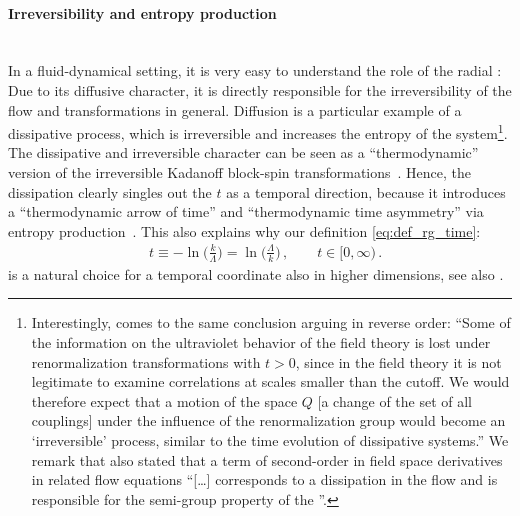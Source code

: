 \paragraph{Irreversibility and entropy production}\label{paragraph:conservative_form_entropy}\mbox{}\\
In a fluid-dynamical setting, it is very easy to understand the role of the radial \sigmaMode{}: Due to its diffusive character, it is directly responsible for the irreversibility of the \grg{} flow and \rg{} transformations in general. 
Diffusion is a particular example of a dissipative process, which is irreversible and increases the entropy of the system\footnote{%
	Interestingly,  comes to the same conclusion arguing in reverse order:
	``Some of the information on the ultraviolet behavior of the field theory is lost under renormalization transformations with $t>0$, since in the field theory it is not legitimate to examine correlations at scales smaller than the cutoff.
	We would therefore expect that a motion of the space $Q$ [a change of the set of all couplings] under the influence of the renormalization group would become an `irreversible' process, similar to the time evolution of dissipative systems.''
	We remark that also  stated that a term of second-order in field space derivatives in related \rg{} flow equations ``[\ldots] corresponds to a dissipation in the flow and is responsible for the semi-group property of the \rg{}''.%
}.
The dissipative and irreversible character can be seen as a ``thermodynamic'' version of the irreversible Kadanoff block-spin transformations~\cite{Kadanoff:1966wm,Wilson:1979qg,Delamotte:2007pf}.
Hence, the dissipation clearly singles out the \rgtime{} $t$ as a temporal direction, because it introduces a ``thermodynamic arrow of time'' and ``thermodynamic time asymmetry'' via entropy production~\cite{Lebowitz:2008}.
This also explains why our definition \eqref{eq:def_rg_time}:
\begin{align}
	&t \equiv - \ln \big( \tfrac{k}{\Lambda} \big) =  \ln \big( \tfrac{\Lambda}{k} \big) \, ,	\qquad	t \in [ 0, \infty ) \, .	\label{eq:rg-time-scale}
\end{align}
is a natural choice for a temporal coordinate also in higher dimensions, see also .

